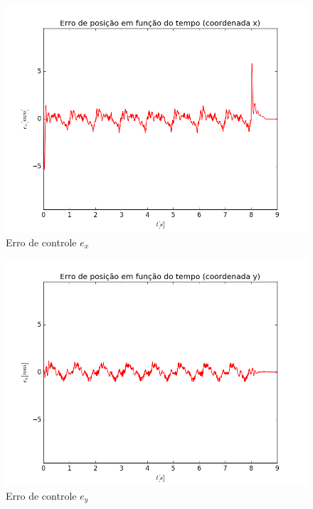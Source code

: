 \documentclass[]{politex}
\begin{document}
\begin{multicols}{2}
\begin{figure}[H]
	\centering
	\includegraphics[scale=0.39]{../../../Experimental/Aquisicoes/PIDSMCx_circulo/ex.png}  
	\caption{Erro de controle $e_x$}
	\label{fig:PIDSMCx_circulo_ex}
\end{figure}
\begin{figure}[H]
	\centering
	\includegraphics[scale=0.39]{../../../Experimental/Aquisicoes/PIDSMCx_circulo/ey.png}  
	\caption{Erro de controle $e_y$}
	\label{fig:PIDSMCx_circulo_ey}
\end{figure}
\end{multicols}
\end{document}
